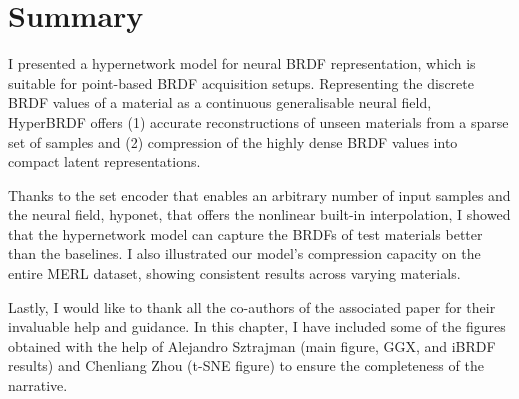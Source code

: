\section{Summary}\label{sec:conc}

I presented a hypernetwork model for neural \gls{BRDF} representation, which is suitable for point-based \gls{BRDF} acquisition setups. Representing the discrete \gls{BRDF} values of a material as a continuous generalisable neural field, HyperBRDF offers (1) accurate reconstructions of unseen materials from a sparse set of samples and (2) compression of the highly dense \gls{BRDF} values into compact latent representations. 

Thanks to the set encoder that enables an arbitrary number of input samples and the neural field, hyponet, that offers the nonlinear built-in interpolation, I showed that the hypernetwork model can capture the \gls{BRDF}s of test materials better than the baselines. I also illustrated our model's compression capacity on the entire MERL dataset, showing consistent results across varying materials. 

Lastly, I would like to thank all the co-authors of the associated paper for their invaluable help and guidance. In this chapter, I have included some of the figures obtained with the help of Alejandro Sztrajman (main figure, GGX, and iBRDF results) and Chenliang Zhou (t-SNE figure) to ensure the completeness of the narrative.